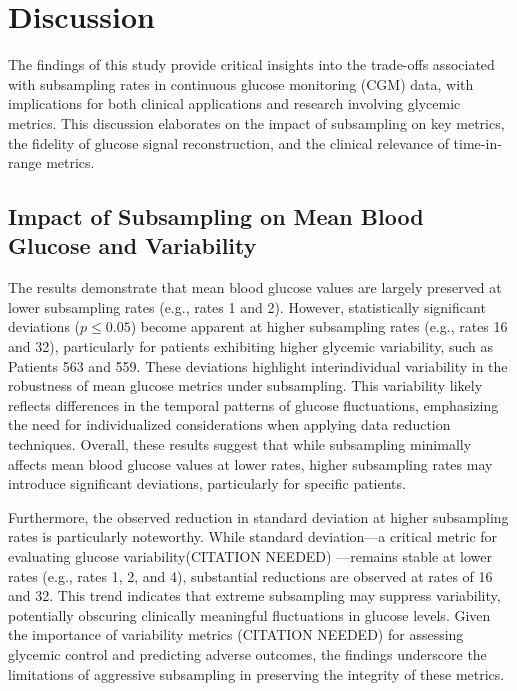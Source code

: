 
\section{Discussion}
The findings of this study provide critical insights into the trade-offs associated with subsampling rates in continuous glucose monitoring (CGM) data, with implications for both clinical applications and research involving glycemic metrics. This discussion elaborates on the impact of subsampling on key metrics, the fidelity of glucose signal reconstruction, and the clinical relevance of time-in-range metrics.

\subsection{Impact of Subsampling on Mean Blood Glucose and Variability}
The results demonstrate that mean blood glucose values are largely preserved at lower subsampling rates (e.g., rates 1 and 2). However, statistically significant deviations ($p \leq 0.05$) become apparent at higher subsampling rates (e.g., rates 16 and 32), particularly for patients exhibiting higher glycemic variability, such as Patients 563 and 559. These deviations highlight interindividual variability in the robustness of mean glucose metrics under subsampling. This variability likely reflects differences in the temporal patterns of glucose fluctuations, emphasizing the need for individualized considerations when applying data reduction techniques.
Overall, these results suggest that while subsampling minimally affects mean blood glucose values at lower rates, higher subsampling rates may introduce significant deviations, particularly for specific patients.

Furthermore, the observed reduction in standard deviation at higher subsampling rates is particularly noteworthy. While standard deviation—a critical metric for evaluating glucose variability(CITATION NEEDED) —remains stable at lower rates (e.g., rates 1, 2, and 4), substantial reductions are observed at rates of 16 and 32. This trend indicates that extreme subsampling may suppress variability, potentially obscuring clinically meaningful fluctuations in glucose levels. Given the importance of variability metrics (CITATION NEEDED) for assessing glycemic control and predicting adverse outcomes, the findings underscore the limitations of aggressive subsampling in preserving the integrity of these metrics.


